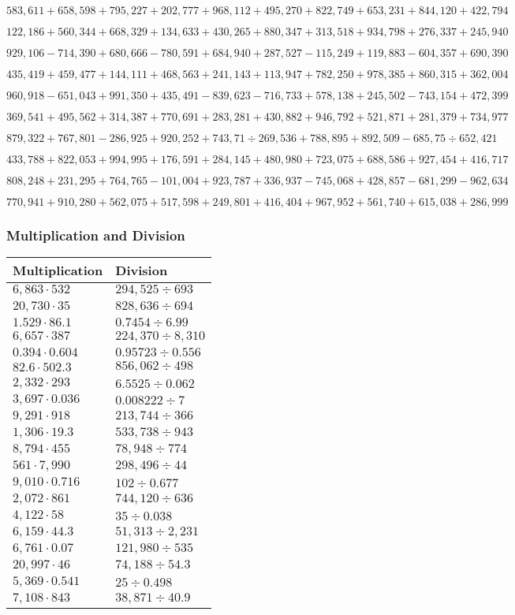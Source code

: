 \(583,611+658,598+795,227+202,777+968,112+495,270+822,749+653,231+844,120+ 422,794\)

\(122,186+560,344+668,329+134,633+430,265+880,347+313,518+934,798+276,337+245,940\)

\(929,106-714,390+680,666-780,591+684,940+287,527-115,249+119,883-604,357+690,390\)

\(435,419+459,477+144,111+468,563+241,143+113,947+782,250+978,385+860,315+362,004\)

\(960,918-651,043+991,350+435,491-839,623-716,733+578,138+245,502-743,154+472,399\)

\(369,541+495,562+314,387+770,691+283,281+430,882+946,792+521,871+281,379+734,977\)

\(879,322+767,801-286,925+920,252+743,71÷269,536+788,895+892,509-685,75÷652,421\)

\(433,788+822,053+994,995+176,591+284,145+480,980+723,075+688,586+927,454+416,717\)

\(808,248+231,295+764,765-101,004+923,787+336,937-745,068+428,857-681,299-962,634\)

\(770,941+910,280+562,075+517,598+249,801+416,404+967,952+561,740+615,038+286,999\)

\hypertarget{multiplication-and-division-309}{%
\subsubsection{Multiplication and
Division}\label{multiplication-and-division-309}}

\begin{longtable}[]{@{}ll@{}}
\toprule
Multiplication & Division\tabularnewline
\midrule
\endhead
\(6,863\cdot532\) & \(294,525÷693\)\tabularnewline
\(20,730\cdot35\) & \(828,636÷694\)\tabularnewline
\(1.529\cdot86.1\) & \(0.7454÷6.99\)\tabularnewline
\(6,657\cdot387\) & \(224,370÷8,310\)\tabularnewline
\(0.394\cdot0.604\) & \(0.95723÷0.556\)\tabularnewline
\(82.6\cdot502.3\) & \(856,062÷498\)\tabularnewline
\(2,332\cdot293\) & \(6.5525÷0.062\)\tabularnewline
\(3,697\cdot0.036\) & \(0.008222÷7\)\tabularnewline
\(9,291\cdot918\) & \(213,744÷366\)\tabularnewline
\(1,306\cdot19.3\) & \(533,738÷943\)\tabularnewline
\(8,794\cdot455\) & \(78,948÷774\)\tabularnewline
\(561\cdot7,990\) & \(298,496÷44\)\tabularnewline
\(9,010\cdot0.716\) & \(102÷0.677\)\tabularnewline
\(2,072\cdot861\) & \(744,120÷636\)\tabularnewline
\(4,122\cdot58\) & \(35÷0.038\)\tabularnewline
\(6,159\cdot44.3\) & \(51,313÷2,231\)\tabularnewline
\(6,761\cdot0.07\) & \(121,980÷535\)\tabularnewline
\(20,997\cdot46\) & \(74,188÷54.3\)\tabularnewline
\(5,369\cdot0.541\) & \(25÷0.498\)\tabularnewline
\(7,108\cdot843\) & \(38,871÷40.9\)\tabularnewline
\bottomrule
\end{longtable}

